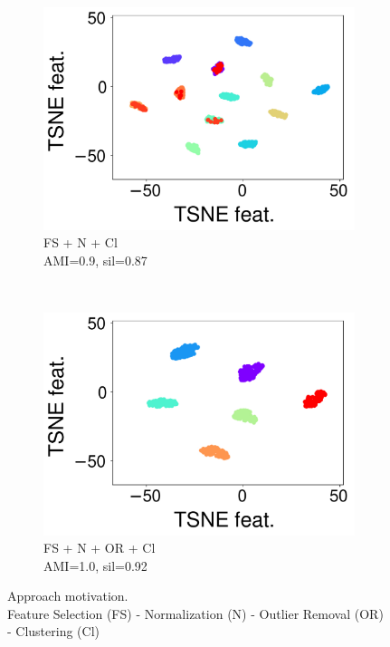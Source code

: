 \documentclass[runningheads]{llncs}
\begin{document}
\begin{figure}[t]
\begin{subfigure}[t]{0.2\columnwidth}
        \centering
        \includegraphics[scale=.15]{img/ft_sc_cl.pdf}
        \caption{FS + N + Cl\\ \scriptsize{AMI=0.9, sil=0.87}}
        \label{fig:ca5}
    \end{subfigure}
    ~
    \begin{subfigure}[t]{0.28\columnwidth}
        \centering
        \includegraphics[scale=.15]{img/ft_sc_ou_cl.pdf}
        \caption{FS + N + OR + Cl\\ \scriptsize{AMI=1.0, sil=0.92}}
        \label{fig:ca6}
    \end{subfigure}
    \caption{Approach motivation. \\
    \small{Feature Selection (FS) - Normalization (N) - Outlier Removal (OR) - Clustering (Cl)}}
    \label{fig:clusterings}
\end{figure}
\end{document}
